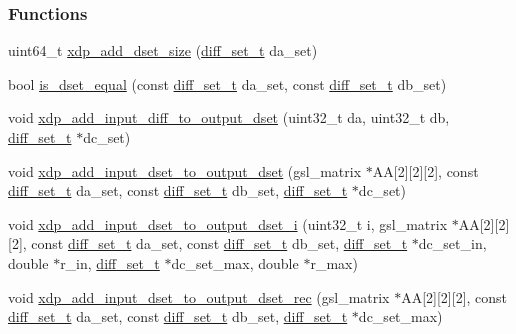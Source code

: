 \subsubsection*{\-Functions}
\begin{DoxyCompactItemize}
\item 
uint64\-\_\-t \hyperlink{xdp-add-diff-set_8cc_a93cd4e95c6e49a2837bc72fa68ffa1e5}{xdp\-\_\-add\-\_\-dset\-\_\-size} (\hyperlink{structdiff__set__t}{diff\-\_\-set\-\_\-t} da\-\_\-set)
\item 
bool \hyperlink{xdp-add-diff-set_8cc_a3337e02c48bbe07e1e0d64da346c955f}{is\-\_\-dset\-\_\-equal} (const \hyperlink{structdiff__set__t}{diff\-\_\-set\-\_\-t} da\-\_\-set, const \hyperlink{structdiff__set__t}{diff\-\_\-set\-\_\-t} db\-\_\-set)
\item 
void \hyperlink{xdp-add-diff-set_8cc_ae8f201e16a902384df5e9cb6cda1a7ad}{xdp\-\_\-add\-\_\-input\-\_\-diff\-\_\-to\-\_\-output\-\_\-dset} (uint32\-\_\-t da, uint32\-\_\-t db, \hyperlink{structdiff__set__t}{diff\-\_\-set\-\_\-t} $\ast$dc\-\_\-set)
\item 
void \hyperlink{xdp-add-diff-set_8cc_a1d5e808d3045ecd90436865429a222f0}{xdp\-\_\-add\-\_\-input\-\_\-dset\-\_\-to\-\_\-output\-\_\-dset} (gsl\-\_\-matrix $\ast$\-A\-A\mbox{[}2\mbox{]}\mbox{[}2\mbox{]}\mbox{[}2\mbox{]}, const \hyperlink{structdiff__set__t}{diff\-\_\-set\-\_\-t} da\-\_\-set, const \hyperlink{structdiff__set__t}{diff\-\_\-set\-\_\-t} db\-\_\-set, \hyperlink{structdiff__set__t}{diff\-\_\-set\-\_\-t} $\ast$dc\-\_\-set)
\item 
void \hyperlink{xdp-add-diff-set_8cc_a8c216973d312f3bc4ebe2cc8ed0d3e8e}{xdp\-\_\-add\-\_\-input\-\_\-dset\-\_\-to\-\_\-output\-\_\-dset\-\_\-i} (uint32\-\_\-t i, gsl\-\_\-matrix $\ast$\-A\-A\mbox{[}2\mbox{]}\mbox{[}2\mbox{]}\mbox{[}2\mbox{]}, const \hyperlink{structdiff__set__t}{diff\-\_\-set\-\_\-t} da\-\_\-set, const \hyperlink{structdiff__set__t}{diff\-\_\-set\-\_\-t} db\-\_\-set, \hyperlink{structdiff__set__t}{diff\-\_\-set\-\_\-t} $\ast$dc\-\_\-set\-\_\-in, double $\ast$r\-\_\-in, \hyperlink{structdiff__set__t}{diff\-\_\-set\-\_\-t} $\ast$dc\-\_\-set\-\_\-max, double $\ast$r\-\_\-max)
\item 
void \hyperlink{xdp-add-diff-set_8cc_a6ee970575419b828471a4590df91acf8}{xdp\-\_\-add\-\_\-input\-\_\-dset\-\_\-to\-\_\-output\-\_\-dset\-\_\-rec} (gsl\-\_\-matrix $\ast$\-A\-A\mbox{[}2\mbox{]}\mbox{[}2\mbox{]}\mbox{[}2\mbox{]}, const \hyperlink{structdiff__set__t}{diff\-\_\-set\-\_\-t} da\-\_\-set, const \hyperlink{structdiff__set__t}{diff\-\_\-set\-\_\-t} db\-\_\-set, \hyperlink{structdiff__set__t}{diff\-\_\-set\-\_\-t} $\ast$dc\-\_\-set\-\_\-max)

\end{DoxyCompactItemize}
